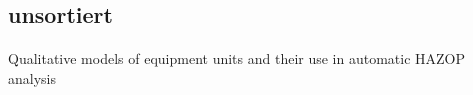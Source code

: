 \subsection{unsortiert}
\paragraph*{\cite{Bartolozzi_2000}} Qualitative models of equipment units and their use in automatic {HAZOP} analysis



